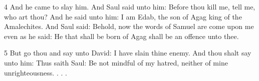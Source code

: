 \par 4 And he came to slay him. And Saul said unto him: Before thou kill me, tell me, who art thou? And he said unto him: I am Edab, the son of Agag king of the Amalechites. And Saul said: Behold, now the words of Samuel are come upon me even as he said: He that shall be born of Agag shall be an offence unto thee. 

\par 5 But go thou and say unto David: I have slain thine enemy. And thou shalt say unto him: Thus saith Saul: Be not mindful of my hatred, neither of mine unrighteousness. . . .



